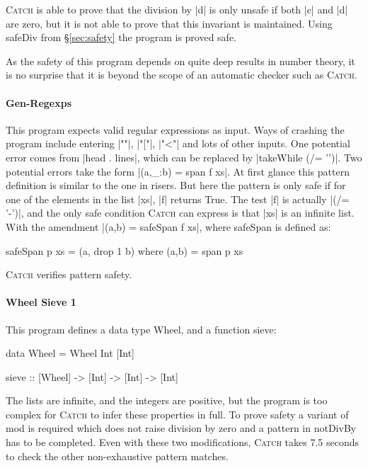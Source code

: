 \documentclass[preprint]{sigplanconf}
\newcommand{\C}[1]{\textsf{#1}}
\newcommand{\catch}{\textsc{Catch}}
\begin{document}
\noindent \catch{} is able to prove that the division by |d| is only unsafe if both |c| and |d| are zero, but it is not able to prove that this invariant is maintained. Using \C{safeDiv} from \S\ref{sec:safety} the program is proved safe.

As the safety of this program depends on quite deep results in number theory, it is no surprise that it is beyond the scope of an automatic checker such as \catch{}.

\paragraph{Gen-Regexps}

This program expects valid regular expressions as input. Ways of crashing the program include entering |""|, |"["|, |"<"| and lots of other inputs. One potential error comes from |head . lines|, which can be replaced by |takeWhile (/= '\n')|. Two potential errors take the form |(a,_:b) = span f xs|. At first glance this pattern definition is similar to the one in \C{risers}. But here the pattern is only safe if for one of the elements in the list |xs|, |f| returns True. The test |f| is actually |(/= '-')|, and the only safe condition \catch{} can express is that |xs| is an infinite list. With the amendment  |(a,b) = safeSpan f xs|, where \C{safeSpan} is defined as:

\begin{code}
safeSpan p xs = (a, drop 1 b) where (a,b) = span p xs
\end{code}

\noindent \catch{} verifies pattern safety.

\paragraph{Wheel Sieve 1}

This program defines a data type \C{Wheel}, and a function \C{sieve}:

\begin{code}
data Wheel = Wheel Int [Int]

sieve :: [Wheel] -> [Int] -> [Int] -> [Int]
\end{code}

The lists are infinite, and the integers are positive, but the program is too complex for \catch{} to infer these properties in full. To prove safety a variant of \C{mod} is required which does not raise division by zero and a pattern in \C{notDivBy} has to be completed. Even with these two modifications, \catch{} takes 7.5 seconds to check the other non-exhaustive pattern matches.
\end{document}
